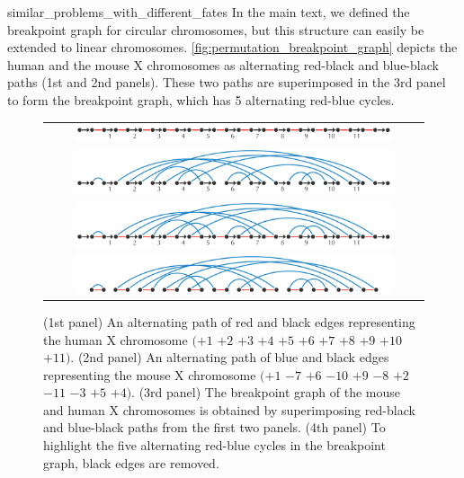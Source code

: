 \begin{detour}{similar_problems_with_different_fates}
In the main text, we defined the breakpoint graph for circular chromosomes, but this structure can easily be extended to linear chromosomes. \autoref{fig:permutation_breakpoint_graph} depicts the human and the mouse X chromosomes as alternating red-black and blue-black paths (1st and 2nd panels). These two paths are superimposed in the 3rd panel to form the breakpoint graph, which has 5 alternating red-blue cycles.\\

\begin{figure}[h]
\mySfFamily
\centering
\begin{tabular}{c}
\includegraphics[width = 0.856\textwidth]{images/rearrangements/permutation_breakpoint_graph_1}\\[3ex]
\includegraphics[width = 0.856\textwidth]{images/rearrangements/permutation_breakpoint_graph_2}\\[3ex]
\includegraphics[width = 0.856\textwidth]{images/rearrangements/permutation_breakpoint_graph_3}\\[3ex]
\includegraphics[width = 0.856\textwidth]{images/rearrangements/permutation_breakpoint_graph_4}
\end{tabular}
\caption{(1st panel) An alternating path of red and black edges representing the human X chromosome $(+1$ $+2$ $+3$ $+4$ $+5$ $+6$ $+7$ $+8$ $+9$ $+10$ $+11)$.   (2nd panel) An alternating path of blue and black edges representing the mouse X chromosome $(+1$ $-7$ $+6$ $-10$ $+9$ $-8$ $+2$ $-11$ $-3$ $+5$ $+4)$. (3rd panel) The breakpoint graph of the mouse and human X chromosomes is obtained by superimposing red-black and blue-black paths from the first two panels. (4th panel) To highlight the five alternating red-blue cycles in the breakpoint graph, black edges are removed.}
\label{fig:permutation_breakpoint_graph}
\end{figure}


\end{detour}
